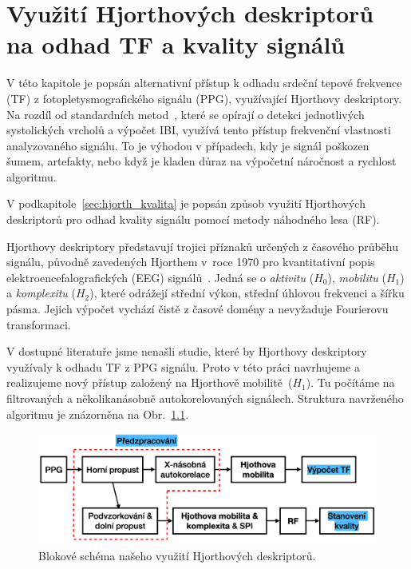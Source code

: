 \chapter{Využití Hjorthových deskriptorů na odhad TF a kvality signálů}
\label{ch:hjorth}
V této kapitole je popsán alternativní přístup k odhadu srdeční tepové frekvence (\acs{TF}) z fotopletysmografického signálu (\acs{PPG}), využívající Hjorthovy deskriptory.
Na rozdíl od standardních metod~\cite{ENIKÖ,Charlton2022,NeuroKit2}, které se opírají o detekci jednotlivých systolických vrcholů a výpočet \acs{IBI}, využívá tento přístup frekvenční vlastnosti analyzovaného signálu.
To je výhodou v případech, kdy je signál poškozen šumem, artefakty, nebo když je kladen důraz na výpočetní náročnost a rychlost algoritmu.

V podkapitole~\ref{sec:hjorth_kvalita} je popsán způsob využití Hjorthových deskriptorů pro odhad kvality signálu pomocí metody náhodného lesa (\acs{RF}).

Hjorthovy deskriptory představují trojici příznaků určených z časového průběhu signálu, původně zavedených Hjorthem v~roce 1970 pro kvantitativní popis elektroencefalografických (\acs{EEG}) signálů~\cite{Hjorth1970,Hjorth1973}.
Jedná se o \textit{aktivitu} (\(H_0\)), \textit{mobilitu} (\(H_1\)) a \textit{komplexitu} (\(H_2\)), které odrážejí střední výkon, střední úhlovou frekvenci a šířku pásma.
Jejich výpočet vychází čistě z časové domény a nevyžaduje Fourierovu transformaci.

V dostupné literatuře jsme nenašli studie, které by Hjorthovy deskriptory využívaly k odhadu \acs{TF} z \acs{PPG} signálu.
Proto v této práci navrhujeme a realizujeme nový přístup založený na Hjorthově mobilitě~(\(H_1\)).
Tu počítáme na filtrovaných a několikanásobně autokorelovaných signálech.
Struktura navrženého algoritmu je znázorněna na Obr.~\ref{fig:hjorth_schemata}.

\begin{figure}[h]
	\centering
	\includegraphics[width=1\textwidth]{./obrazky/hjorth_schema.png}
	\caption[Schéma našeho algorimu, který využívá Hjorthových deskriptorů]{Blokové schéma našeho využití Hjorthových deskriptorů.}
	\label{fig:hjorth_schemata}
\end{figure}

